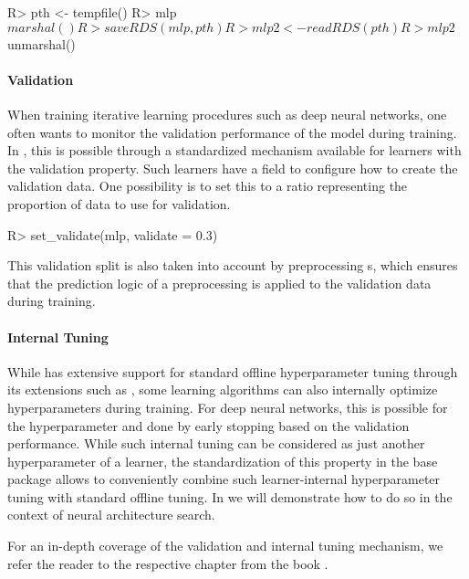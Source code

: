 \documentclass[article]{jss}
\theoremstyle{definition}
\begin{document}
\begin{CodeInput}
R> pth <- tempfile()
R> mlp$marshal()
R> saveRDS(mlp, pth)
R> mlp2 <- readRDS(pth)
R> mlp2$unmarshal()
\end{CodeInput}

\paragraph{Validation}

When training iterative learning procedures such as deep neural networks, one often wants to monitor the validation performance of the model during training.
In \mlrt{}, this is possible through a standardized mechanism available for learners with the validation property.
Such learners have a  field to configure how to create the validation data.
One possibility is to set this to a ratio representing the proportion of data to use for validation.

\begin{CodeInput}
R> set_validate(mlp, validate = 0.3)
\end{CodeInput}

This validation split is also taken into account by preprocessing s, which ensures that the prediction logic of a preprocessing  is applied to the validation data during training.

\paragraph{Internal Tuning}

While \mlrt{} has extensive support for standard offline hyperparameter tuning through its extensions such as  \citep{ref-mlr3tuning2024}, some learning algorithms can also internally optimize hyperparameters during training.
For deep neural networks, this is possible for the  hyperparameter and done by early stopping based on the validation performance.
While such internal tuning can be considered as just another hyperparameter of a learner, the standardization of this property in the \mlrt{} base package allows to conveniently combine such learner-internal hyperparameter tuning with standard offline tuning.
In  we will demonstrate how to do so in the context of neural architecture search.

For an in-depth coverage of the validation and internal tuning mechanism, we refer the reader to the respective chapter from the  book \citep{ref-mlr3book-valid}.
\end{document}
